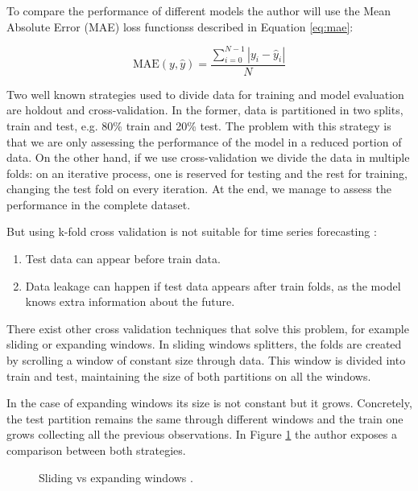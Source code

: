 To compare the performance of different models the author will use the Mean Absolute Error (MAE) loss functionss described in Equation \ref{eq:mae}:

\begin{equation}
 \text{MAE}(y, \hat{y}) = \frac{ \sum_{i=0}^{N - 1} |y_i - \hat{y}_i| }{N}
 \label{eq:mae}
\end{equation}

Two well known strategies used to divide data for training and model evaluation are holdout and cross-validation.
In the former, data is partitioned in two splits, train and test, e.g. 80\% train and 20\% test.
The problem with this strategy is that we are only assessing the performance of the model in a reduced portion of data.
On the other hand, if we use cross-validation we divide the data in multiple folds: on an iterative process, one is reserved for testing and the rest for training, changing the test fold on every iteration.
At the end, we manage to assess the performance in the complete dataset.

\noindent But using k-fold cross validation is not suitable for time series forecasting \cite{cross-validation-types}:
\begin{enumerate}
    \item Test data can appear before train data.
    \item Data leakage can happen if test data appears after train folds, as the model knows extra information about the future.
\end{enumerate}

There exist other cross validation techniques that solve this problem, for example sliding or expanding windows.
In sliding windows splitters, the folds are created by scrolling a window of constant size through data.
This window is divided into train and test, maintaining the size of both partitions on all the windows.

In the case of expanding windows its size is not constant but it grows. Concretely, the test partition remains the same through different windows and the train one grows collecting all the previous observations.
In Figure \ref{fig:sliding-expanding-windows} the author exposes a comparison between both strategies.

\begin{figure}[H]
\centering
    \caption{Sliding vs expanding windows \cite{sliding-expanding-windows}.}
    \label{fig:sliding-expanding-windows}
\end{figure}

